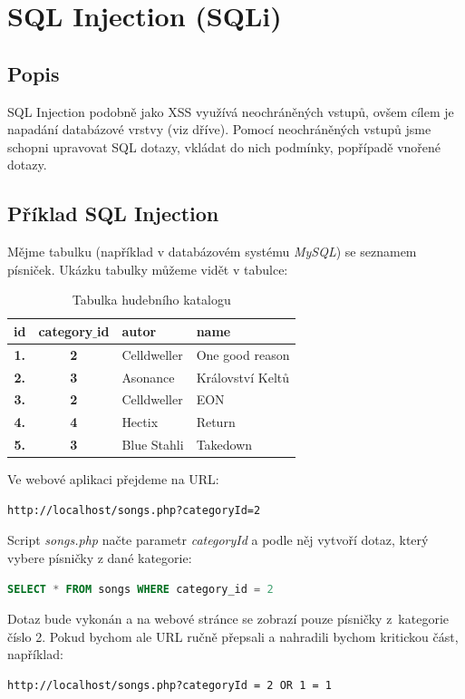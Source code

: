 \chapter{SQL Injection (SQLi)}
\section{Popis}
SQL Injection podobně jako XSS využívá neochráněných vstupů, ovšem cílem je napadání databázové vrstvy (viz dříve). Pomocí neochráněných vstupů jsme schopni upravovat SQL dotazy, vkládat do nich podmínky, popřípadě vnořené dotazy.

\section{Příklad SQL Injection}
Mějme tabulku (například v databázovém systému \textit{MySQL}) se seznamem písniček. Ukázku tabulky můžeme vidět v tabulce:
\begin{table}[!h]
\centering
\begin{tabular}{|c|c|l|l|}
\hline
\bf id & \bf category$\_$id & \bf autor & \bf name \\
\hline
\hline
\bf 1. & \bf 2 & Celldweller & One good reason \\
\hline
\bf 2. & \bf 3 & Asonance & Království Keltů \\
\hline
\bf 3. & \bf 2 & Celldweller & EON \\
\hline
\bf 4. & \bf 4 & Hectix & Return \\
\hline
\bf 5. & \bf 3 & Blue Stahli & Takedown\\
\hline
\end{tabular}
\label{tab:hac}
\caption{Tabulka hudebního katalogu}
\end{table}
\newline
Ve webové aplikaci přejdeme na URL:
\begin{lstlisting}[label=web_app_url_1,language=HTML, caption=URL webové aplikace]
http://localhost/songs.php?categoryId=2
\end{lstlisting}

Script \textit{songs.php} načte parametr \textit{categoryId} a podle něj vytvoří dotaz, který vybere písničky z dané kategorie:

\begin{lstlisting}[label=web_app_url_2,language=SQL, caption=Vytvořený SQL dotaz]
SELECT * FROM songs WHERE category_id = 2
\end{lstlisting}

Dotaz bude vykonán a na webové stránce se zobrazí pouze písničky z~kategorie číslo 2. Pokud bychom ale URL ručně přepsali a nahradili bychom kritickou část, například:
\begin{lstlisting}[label=web_app_url_3,language=HTML, caption=Ručně upravené URL]
http://localhost/songs.php?categoryId = 2 OR 1 = 1
\end{lstlisting}

